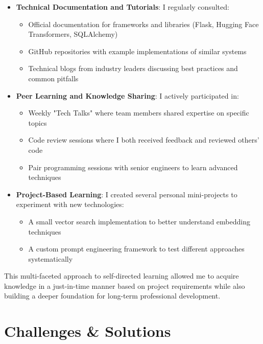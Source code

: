 \documentclass[12pt,a4paper]{article}
\begin{document}
\begin{itemize}
    
    \item \textbf{Technical Documentation and Tutorials}: I regularly consulted:
    \begin{itemize}
        \item Official documentation for frameworks and libraries (Flask, Hugging Face Transformers, SQLAlchemy)
        \item GitHub repositories with example implementations of similar systems
        \item Technical blogs from industry leaders discussing best practices and common pitfalls
    \end{itemize}
    
    \item \textbf{Peer Learning and Knowledge Sharing}: I actively participated in:
    \begin{itemize}
        \item Weekly "Tech Talks" where team members shared expertise on specific topics
        \item Code review sessions where I both received feedback and reviewed others' code
        \item Pair programming sessions with senior engineers to learn advanced techniques
    \end{itemize}
    
    \item \textbf{Project-Based Learning}: I created several personal mini-projects to experiment with new technologies:
    \begin{itemize}
        \item A small vector search implementation to better understand embedding techniques
        \item A custom prompt engineering framework to test different approaches systematically
    \end{itemize}
    
\end{itemize}

This multi-faceted approach to self-directed learning allowed me to acquire knowledge in a just-in-time manner based on project requirements while also building a deeper foundation for long-term professional development.



\newpage
\section{Challenges \& Solutions}
\end{document}
